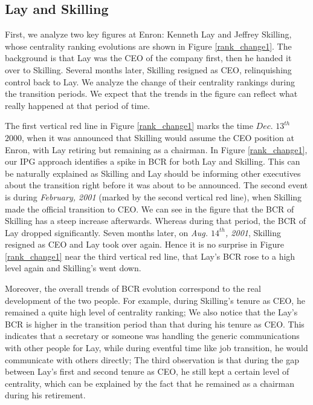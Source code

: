 \documentclass[\main/thesis.tex]{subfiles}
\begin{document}
\subsection*{Lay and Skilling}
First, we analyze two key figures at Enron: Kenneth Lay and Jeffrey Skilling, whose centrality ranking evolutions are shown in Figure \ref{rank_change1}. The background is that Lay was the CEO of the company first, then he handed it over to Skilling. Several months later, Skilling resigned as CEO, relinquishing control back to Lay. We analyze the change of their centrality rankings during the transition periods. We expect that the trends in the figure can reflect what really happened at that period of time.

The first vertical red line in Figure \ref{rank_change1} marks the time $\textit{Dec. $13^{th}$}$ $\textit{2000}$, when it was announced that Skilling would assume the CEO position at Enron, with Lay retiring but remaining as a chairman. In Figure \ref{rank_change1}, our IPG approach identifies a spike in BCR for both Lay and Skilling. This can be naturally explained as Skilling and Lay should be informing other executives about the transition right before it was about to be announced. The second event is during \textit{February, 2001} (marked by the second vertical red line), when Skilling made the official transition to CEO. We can see in the figure that the BCR of Skilling has a steep increase afterwards. Whereas during that period, the BCR of Lay dropped significantly. Seven months later, on \textit{Aug. $14^{th}$, 2001}, Skilling resigned as CEO and Lay took over again. Hence it is no surprise in Figure \ref{rank_change1} near the third vertical red line, that Lay's BCR rose to a high level again and Skilling's went down. 

Moreover, the overall trends of BCR evolution correspond to the real development of the two people. For example, during Skilling's tenure as CEO, he remained a quite high level of centrality ranking; We also notice that the Lay's BCR is higher in the transition period than that during his tenure as CEO. This indicates that a secretary or someone was handling the generic communications with other people for Lay, while during eventful time like job transition, he would communicate with others directly; The third observation is that during the gap between Lay's first and second tenure as CEO, he still kept a certain level of centrality, which can be explained by the fact that he remained as a chairman during his retirement.
\end{document}
